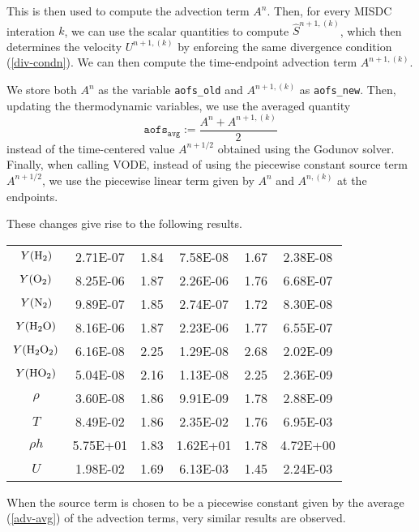 \documentclass[12pt]{article}
\begin{document}
This is then used to compute the advection term $A^n$. Then, for every MISDC 
interation $k$, we can use the scalar quantities to compute 
$\widehat{S}^{n+1,(k)}$, which then determines the velocity $U^{n+1,(k)}$ by 
enforcing the same divergence condition (\ref{div-condn}). We can then compute 
the time-endpoint advection term $A^{n+1,(k)}$.

We store both $A^n$ as the variable \texttt{aofs\_old} and $A^{n+1,(k)}$ as 
\texttt{aofs\_new}. Then, updating the thermodynamic variables, we use the 
averaged quantity
\begin{equation}
   \label{adv-avg}
   \texttt{aofs}_\texttt{avg} := \frac{A^n + A^{n+1,(k)}}{2}
\end{equation}
instead of the time-centered value $A^{n+1/2}$ obtained using the Godunov solver.
Finally, when calling VODE, instead of using the piecewise constant source term 
$A^{n+1/2}$, we use the piecewise linear term given by $A^n$ and $A^{n,(k)}$ at 
the endpoints.

These changes give rise to the following results.\\

\begin{center}
\begin{tabular}{ c c c c c c }
$Y({\rm H}_2)$          & 2.71E-07 & 1.84 & 7.58E-08 & 1.67 & 2.38E-08 \\
$Y({\rm O}_2)$          & 8.25E-06 & 1.87 & 2.26E-06 & 1.76 & 6.68E-07 \\
$Y({\rm N}_2)$          & 9.89E-07 & 1.85 & 2.74E-07 & 1.72 & 8.30E-08 \\
$Y({\rm H}_2{\rm O})$   & 8.16E-06 & 1.87 & 2.23E-06 & 1.77 & 6.55E-07 \\
$Y({\rm H}_2{\rm O}_2)$ & 6.16E-08 & 2.25 & 1.29E-08 & 2.68 & 2.02E-09 \\
$Y({\rm HO}_2)$         & 5.04E-08 & 2.16 & 1.13E-08 & 2.25 & 2.36E-09 \\
$\rho$                  & 3.60E-08 & 1.86 & 9.91E-09 & 1.78 & 2.88E-09 \\
$T$                     & 8.49E-02 & 1.86 & 2.35E-02 & 1.76 & 6.95E-03 \\
$\rho h$                & 5.75E+01 & 1.83 & 1.62E+01 & 1.78 & 4.72E+00 \\
$U$                     & 1.98E-02 & 1.69 & 6.13E-03 & 1.45 & 2.24E-03 \\
\end{tabular}
\end{center}

When the source term is chosen to be a piecewise constant given by the average 
(\ref{adv-avg}) of the advection terms, very similar results are observed. \\
\end{document}
